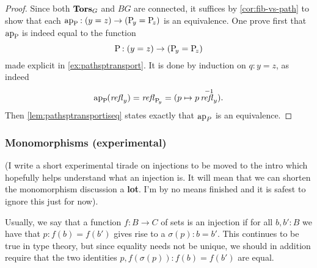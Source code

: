 \begin{proof}
  Since both $\mathbf{Tors}_G$ and $BG$ are connected, it suffices by
  \cref{cor:fib-vs-path} to show that each
  $\mathop{\mathrm{ap}_{\mathrm{P}_{\!}}}:(y=z)\to(\mathrm{P}_{\!y}=\mathrm{P}_{\!z})$ is an
  equivalence. One prove first that $\mathop{\mathrm{ap}_{\mathrm{P}_{\!}}}$ is indeed equal
  to the function
  $$\mathrm{P}_{\!}:(y=z)\to(\mathrm{P}_{\!y}= \mathrm{P}_{\!z})$$
  made explicit in \cref{ex:pathsptransport}. It is done by induction
  on $q:y=z$, as indeed
  \begin{displaymath}
    \mathop{\mathrm{ap}_{\mathrm{P}_{\!}}}(\mathop{\mathit{refl}_{y}}) = \mathop{\mathit{refl}_{\mathrm{P}_{\!y}}} = (p\mapsto p\mathop{\mathit{refl}_{y}}^{-1}).
  \end{displaymath}
  Then \cref{lem:pathsptransportiseq} states exactly that $\mathop{\mathrm{ap}_{P}}$ is
  an equivalence.
%
%

\end{proof}

\subsubsection{Monomorphisms (experimental)}

(I write a short experimental tirade on injections to be moved to the intro which hopefully helps understand what an injection is.  It will mean that we can shorten the monomorphism discussion a {\bf lot}.  I'm by no means finished and it is safest to ignore this just for now).

Usually, we say that a function $f:B\to C$ of sets is an injection if for all $b,b':B$ we have that $p:f(b)=f(b')$ gives rise to a $\sigma(p):b=b'$.
This continues to be true in type theory, but since equality needs not be unique, we should in addition require that the two identities $p, f(\sigma(p)):f(b)=f(b')$ are equal.

